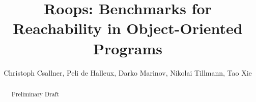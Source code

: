 \documentclass{article}
\title{Roops: Benchmarks for\\Reachability in Object-Oriented Programs}
\author{Christoph Csallner, Peli de Halleux, Darko Marinov, Nikolai Tillmann, Tao Xie}
\begin{document}
\maketitle

\tableofcontents

\begin{abstract}
Preliminary Draft
\end{abstract}





\appendix






\end{document}
